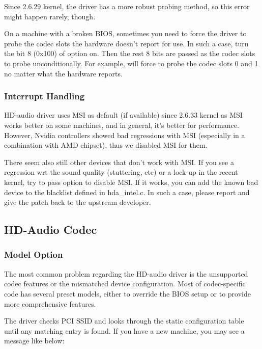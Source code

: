 \documentclass[a4paper,8pt,english]{sphinxmanual}
\begin{document}
Since 2.6.29 kernel, the driver has a more robust probing method, so
this error might happen rarely, though.

On a machine with a broken BIOS, sometimes you need to force the
driver to probe the codec slots the hardware doesn't report for use.
In such a case, turn the bit 8 (0x100) of  option on.
Then the rest 8 bits are passed as the codec slots to probe
unconditionally.  For example,  will force to probe
the codec slots 0 and 1 no matter what the hardware reports.


\subsubsection{Interrupt Handling}
\label{sound/hd-audio/notes:interrupt-handling}
HD-audio driver uses MSI as default (if available) since 2.6.33
kernel as MSI works better on some machines, and in general, it's
better for performance.  However, Nvidia controllers showed bad
regressions with MSI (especially in a combination with AMD chipset),
thus we disabled MSI for them.

There seem also still other devices that don't work with MSI.  If you
see a regression wrt the sound quality (stuttering, etc) or a lock-up
in the recent kernel, try to pass  option to disable
MSI.  If it works, you can add the known bad device to the blacklist
defined in hda\_intel.c.  In such a case, please report and give the
patch back to the upstream developer.


\subsection{HD-Audio Codec}
\label{sound/hd-audio/notes:hd-audio-codec}

\subsubsection{Model Option}
\label{sound/hd-audio/notes:model-option}
The most common problem regarding the HD-audio driver is the
unsupported codec features or the mismatched device configuration.
Most of codec-specific code has several preset models, either to
override the BIOS setup or to provide more comprehensive features.

The driver checks PCI SSID and looks through the static configuration
table until any matching entry is found.  If you have a new machine,
you may see a message like below:
\end{document}
